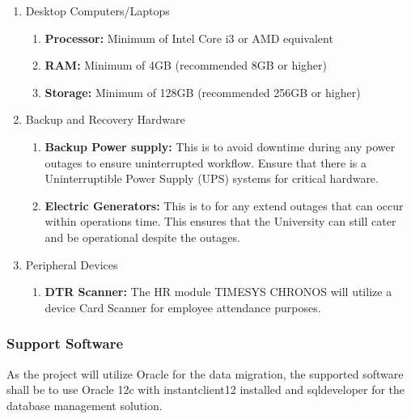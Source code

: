         \begin{enumerate}
            \item Desktop Computers/Laptops
            \begin{enumerate}
                \item \textbf{Processor:} Minimum of Intel Core i3 or AMD equivalent
                \item \textbf{RAM:} Minimum of 4GB (recommended 8GB or higher)
                \item \textbf{Storage:} Minimum of 128GB (recommended 256GB or higher)
            \end{enumerate}
            
            \item Backup and Recovery Hardware
            \begin{enumerate}
                \item \textbf{Backup Power supply:} This is to avoid downtime during any power outages to ensure uninterrupted workflow. Ensure that there is a Uninterruptible Power Supply (UPS) systems for critical hardware.
                
                \item \textbf{Electric Generators:} This is to for any extend outages that can occur within operations time. This ensures that the University can still cater and be operational despite the outages.
            \end{enumerate}
            
            \item Peripheral Devices
            \begin{enumerate}
                \item \textbf{DTR Scanner:} The HR module TIMESYS CHRONOS will utilize a device Card Scanner for employee attendance purposes.
            \end{enumerate}
            
        \end{enumerate}

        \subsubsection{Support Software}

        As the project will utilize Oracle for the data migration, the supported software shall be to use Oracle 12c with instantclient12 installed and sqldeveloper for the database management solution. 

